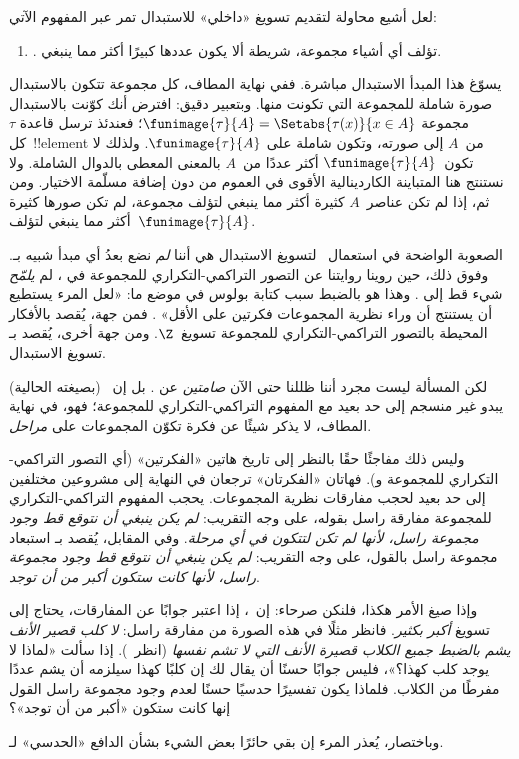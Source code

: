 \documentclass[../../../include/open-logic-section]{subfiles}
\begin{document}

لعل أشيع محاولة لتقديم تسويغ «داخلي» للاستبدال تمر عبر المفهوم الآتي:
\begin{enumerate}
	\item[] \limofsize. تؤلف أي أشياء مجموعة، شريطة ألا يكون عددها
	كبيرًا أكثر مما ينبغي.
\end{enumerate}
يسوّغ هذا المبدأ الاستبدال مباشرة. ففي نهاية المطاف، كل مجموعة تتكون
بالاستبدال صورة شاملة للمجموعة التي تكونت منها.
وبتعبير دقيق: افترض أنك كوّنت بالاستبدال مجموعة
$\funimage{\tau}{A} = \Setabs{\tau(x)}{x \in A}$؛ فعندئذ ترسل قاعدة
$\tau$ كل~!!{element} من~$A$ إلى صورته، وتكون شاملة على
$\funimage{\tau}{A}$. ولذلك لا تكون~$\funimage{\tau}{A}$ أكثر عددًا
من~$A$ بالمعنى المعطى بالدوال الشاملة. ولا نستنتج هنا المتباينة الكاردينالية الأقوى
في العموم من دون إضافة مسلّمة الاختيار. ومن ثم، إذا لم تكن عناصر~$A$
كثيرة أكثر مما ينبغي لتؤلف مجموعة، لم تكن صورها كثيرة أكثر مما ينبغي
لتؤلف~$\funimage{\tau}{A}$.

الصعوبة الواضحة في استعمال~\limofsize{} لتسويغ الاستبدال هي أننا
\emph{لم} نضع بعدُ أي مبدأ شبيه بـ\limofsize. وفوق ذلك، حين روينا
روايتنا عن التصور التراكمي-التكراري للمجموعة في
، لم \emph{يلمّح} شيء قط إلى
\limofsize. وهذا هو بالضبط سبب كتابة بولوس في موضع ما: «لعل المرء
يستطيع أن يستنتج أن وراء نظرية المجموعات فكرتين على الأقل»
\citeyearpar[p.~19]{Boolos1989}. فمن جهة، يُقصد بالأفكار المحيطة
بالتصور التراكمي-التكراري للمجموعة تسويغ~$\Z$. ومن جهة أخرى، يُقصد
بـ\limofsize{} تسويغ الاستبدال.

لكن المسألة ليست مجرد أننا ظللنا حتى الآن \emph{صامتين} عن
\limofsize. بل إن~\limofsize{} (بصيغته الحالية) يبدو غير منسجم إلى
حد بعيد مع المفهوم التراكمي-التكراري للمجموعة؛ فهو، في نهاية المطاف،
لا يذكر شيئًا عن فكرة تكوّن المجموعات على \emph{مراحل}.

وليس ذلك مفاجئًا حقًا بالنظر إلى تاريخ هاتين «الفكرتين» (أي التصور
التراكمي-التكراري للمجموعة و\limofsize). فهاتان «الفكرتان» ترجعان في
النهاية إلى مشروعين مختلفين إلى حد بعيد لحجب مفارقات نظرية المجموعات.
يحجب المفهوم التراكمي-التكراري للمجموعة مفارقة راسل بقوله، على وجه
التقريب: \emph{لم يكن ينبغي أن نتوقع قط وجود مجموعة راسل، لأنها لم
تكن لتتكون في أي مرحلة}. وفي المقابل، يُقصد بـ\limofsize{} استبعاد
مجموعة راسل بالقول، على وجه التقريب: \emph{لم يكن ينبغي أن نتوقع قط
وجود مجموعة راسل، لأنها كانت ستكون أكبر من أن توجد}.

وإذا صيغ الأمر هكذا، فلنكن صرحاء: إن~\limofsize{}، إذا اعتبر جوابًا
عن المفارقات، يحتاج إلى تسويغ \emph{أكبر بكثير}. فانظر مثلًا في هذه
الصورة من مفارقة راسل: \emph{لا كلب قصير الأنف يشم بالضبط جميع الكلاب
قصيرة الأنف التي لا تشم نفسها} (انظر~).
إذا سألت «لماذا لا يوجد كلب كهذا؟»، فليس جوابًا حسنًا أن يقال لك إن
كلبًا كهذا سيلزمه أن يشم عددًا مفرطًا من الكلاب. فلماذا يكون تفسيرًا
حدسيًا حسنًا لعدم وجود مجموعة راسل القول إنها كانت ستكون «أكبر من أن
توجد»؟

وباختصار، يُعذر المرء إن بقي حائرًا بعض الشيء بشأن الدافع «الحدسي»
لـ\limofsize.
\end{document}
